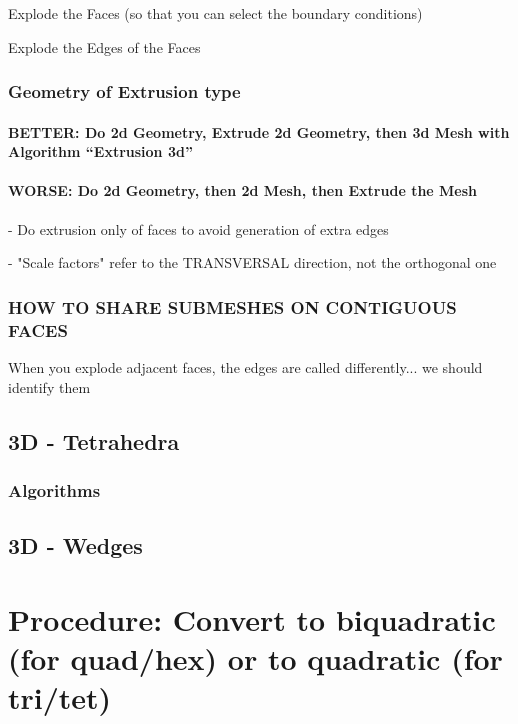 \documentclass[10pt]{book}
\begin{document}
  Explode the Faces (so that you can select the boundary conditions)
  
  Explode the Edges of the Faces
  
  
  
 \subsection{Geometry of Extrusion type}
 
  
  \subsubsection{BETTER: Do 2d Geometry, Extrude 2d Geometry, then 3d Mesh with Algorithm ``Extrusion 3d''}
  
  
  \subsubsection{WORSE: Do 2d Geometry, then 2d Mesh, then Extrude the Mesh}
 
 
 - Do extrusion only of faces to avoid generation of extra edges    

  - "Scale factors" refer to the TRANSVERSAL direction, not the orthogonal one



\subsection{HOW TO SHARE SUBMESHES ON CONTIGUOUS FACES}


When you explode adjacent faces, the edges are called differently... we should identify them

 
 
  \section{3D - Tetrahedra}
  
   \subsection{Algorithms}
   
   
   

  \section{3D - Wedges}
  
  
  \chapter{Procedure: Convert to biquadratic (for quad/hex) or to quadratic (for tri/tet)}
  
\end{document}
